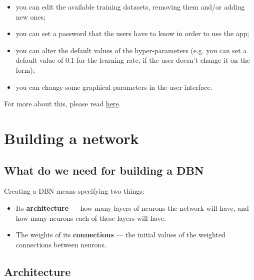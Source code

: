 \documentclass[a4paper]{article}
\begin{document}
	\begin{itemize}
		
			
	\item you can edit the available training datasets, removing them and/or adding new ones;
			
	\item you can set a password that the users have to know in order to use the app;
			
	\item you can alter the default values of the hyper-parameters (e.g. you can set a default value of 0.1 for the learning rate, if the user doesn't change it on the form);
			
	\item you can change some graphical parameters in the user interface.
		
	\end{itemize}

		
For more about this, please read \href{05_admin.html}{here}.
	


		
	\section{Building a network}


		
	\subsection{What do we need for building a DBN}

		
Creating a DBN means specifying two things:
		
	\begin{itemize}
		
			
	\item Its \textbf{architecture} --- how many layers of neurons the network will have, and how many neurons each of these layers will have.
			
	\item The weights of its \textbf{connections} --- the initial values of the weighted connections between neurons.
		
	\end{itemize}


		
	\subsection{Architecture}
\end{document}

